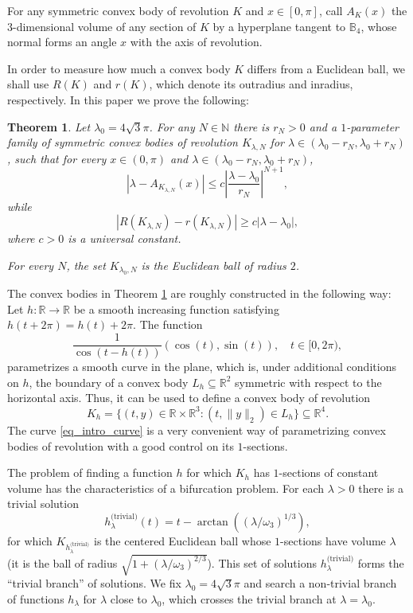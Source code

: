 \documentclass{amsart}
\def \R{\mathbb R}
\def \B{\mathbb B}
\def \N{\mathbb N}
\newtheorem{theorem}{Theorem}
\begin{document}
For any symmetric convex body of revolution $K$ and $x \in [0,\pi]$, call $A_K(x)$ the $3$-dimensional volume of any section of $K$ by a hyperplane tangent to $\B_4$, whose normal forms an angle $x$ with the axis of revolution.

In order to measure how much a convex body $K$ differs from a Euclidean ball, we shall use $R(K)$ and $r(K)$, which denote its outradius and inradius, respectively.
In this paper we prove the following:

\begin{theorem}
	\label{thm_approximate}
	Let $\lambda_0 = 4 \sqrt{3}\pi$.
	For any $N \in \N$ there is $r_N > 0$ and a $1$-parameter family of symmetric convex bodies of revolution $K_{\lambda, N}$ for $\lambda \in (\lambda_0-r_N, \lambda_0 + r_N)$, such that for every $x \in (0,\pi)$ and $\lambda \in (\lambda_0-r_N, \lambda_0 + r_N)$,
	\[| \lambda - A_{K_{\lambda,N}}(x)| \leq c \left|\frac{\lambda-\lambda_0}{r_N} \right|^{N+1},\]
	while
	\[ |R(K_{\lambda,N}) - r(K_{\lambda,N})| \geq c |\lambda - \lambda_0|,\]
	where $c>0$ is a universal constant.

	For every $N$, the set $K_{\lambda_0, N}$ is the Euclidean ball of radius $2$.
\end{theorem}

The convex bodies in Theorem \ref{thm_approximate} are roughly constructed in the following way:
Let $h:\R \to \R$ be a smooth increasing function satisfying $h(t + 2 \pi) = h(t) + 2\pi$.
The function
\begin{equation}
	\label{eq_intro_curve}
	\frac 1 {\cos(t - h(t))} (\cos(t), \sin(t)),\quad t \in [0, 2\pi),
\end{equation}
parametrizes a smooth curve in the plane, which is, under additional conditions on $h$, the boundary of a convex body $L_h \subseteq \R^2$ symmetric with respect to the horizontal axis.
Thus, it can be used to define a convex body of revolution
\[K_h = \{(t, y) \in \R \times \R^3 : (t, \|y\|_2) \in L_h\} \subseteq \R^4.\]
The curve \eqref{eq_intro_curve} is a very convenient way of parametrizing convex bodies of revolution with a good control on its $1$-sections.

The problem of finding a function $h$ for which $K_h$ has $1$-sections of constant volume has the characteristics of a bifurcation problem.
For each $\lambda>0$ there is a trivial solution
\[
	h_\lambda^{\text{(trivial)}}(t) = t - \arctan((\lambda/\omega_3)^{1/3}),
\]
for which $K_{h_\lambda^{\text{(trivial)}}}$ is the centered Euclidean ball whose $1$-sections have volume $\lambda$ (it is the ball of radius $\sqrt{1+(\lambda/\omega_3)^{2/3}}$). This set of solutions $h_\lambda^{\text{(trivial)}}$ forms the ``trivial branch'' of solutions.
We fix $\lambda_0 = 4 \sqrt{3}\pi$ and search a non-trivial branch of functions $h_\lambda$ for $\lambda$ close to $\lambda_0$, which crosses the trivial branch at $\lambda = \lambda_0$.
\end{document}
